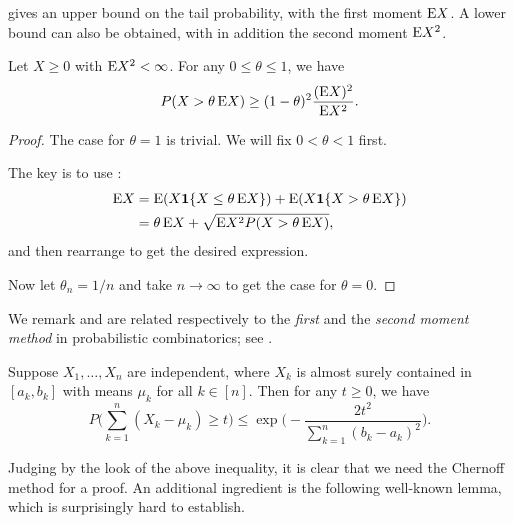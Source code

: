  gives an upper bound on the tail probability, with the first moment $\mathop{}\!\mathrm{E} X$. A lower bound can also be obtained, with in addition the second moment $\mathop{}\!\mathrm{E} X^2$.

\begin{namedthm} \label{thm:PZ-ineq}
    Let $X \geq 0$ with $\mathop{}\!\mathrm{E} X^2 < \infty$. For any $0\leq \theta\leq 1$, we have \[
        P(X > \theta \mathop{}\!\mathrm{E} X) \geq (1-\theta)^2 \frac{(\mathop{}\!\mathrm{E} X)^2}{\mathop{}\!\mathrm{E} X^2}.
    \]
\end{namedthm}
\begin{proof}
    The case for $\theta = 1$ is trivial. We will fix $0 < \theta < 1$ first.

    The key is to use : \begin{align*}
        \E X & = \E (X \ind\{X \leq \theta \E X\}) + \E(X \ind\{X > \theta \E X\}) \\
        & = \theta \E X + \sqrt{\E X^2 P(X > \theta \E X)},
    \end{align*} and then rearrange to get the desired expression.

    Now let $\theta_n = 1/n$ and take $n \to \infty$ to get the case for $\theta = 0$.
\end{proof}

We remark  and  are related respectively to the \emph{first} and the \emph{second moment method} in probabilistic combinatorics; see \cite[Chapter~2]{Roch_2024}.



\begin{namedthm} \label{thm:Hoeffding-ineq}
    Suppose $X_{1},\ldots,X_{n}$ are independent,
    where $X_{k}$ is almost surely contained in $[a_{k},b_{k}]$ with
    means $\mu_{k}$ for all $k\in[n]$. Then for any $t\geq0$, we have
    \[
        P\biggl(\sum_{k=1}^{n}(X_{k}-\mu_{k})\geq t\biggr)\leq\exp\biggl(-\frac{2t^{2}}{\sum_{k=1}^{n}(b_{k}-a_{k})^{2}}\biggr).
    \]
\end{namedthm}

Judging by the look of the above inequality, it is clear that we need the Chernoff method for a proof. An additional ingredient is the following well-known lemma, which is surprisingly hard to establish.


